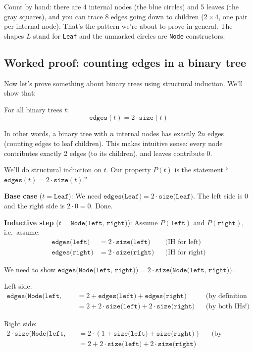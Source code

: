 \documentclass[11pt]{article}
\begin{document}
Count by hand: there are 4 internal nodes (the blue circles) and 5 leaves (the gray squares), and you can trace 8 edges going down to children ($2 \times 4$, one pair per internal node). That's the pattern we're about to prove in general. The shapes $L$ stand for \texttt{Leaf} and the unmarked circles are \texttt{Node} constructors.

\subsection{Worked proof: counting edges in a binary tree}

Now let's prove something about binary trees using structural induction. We'll show that:

For all binary trees $t$:
\[
\texttt{edges}(t) = 2 \cdot \texttt{size}(t)
\]

In other words, a binary tree with $n$ internal nodes has exactly $2n$ edges (counting edges to leaf children). This makes intuitive sense: every node contributes exactly 2 edges (to its children), and leaves contribute 0.

We'll do structural induction on $t$. Our property $P(t)$ is the statement ``$\texttt{edges}(t) = 2 \cdot \texttt{size}(t)$.''

\textbf{Base case} ($t = \texttt{Leaf}$): We need $\texttt{edges(Leaf)} = 2 \cdot \texttt{size(Leaf)}$. The left side is $0$ and the right side is $2 \cdot 0 = 0$. Done.

\textbf{Inductive step} ($t = \texttt{Node(left, right)}$): Assume $P(\texttt{left})$ and $P(\texttt{right})$, i.e.\ assume:
\begin{align*}
\texttt{edges(left)} &= 2 \cdot \texttt{size(left)} && \text{(IH for left)} \\
\texttt{edges(right)} &= 2 \cdot \texttt{size(right)} && \text{(IH for right)}
\end{align*}

We need to show $\texttt{edges(Node(left, right))} = 2 \cdot \texttt{size(Node(left, right))}$.

Left side:
\begin{align*}
\texttt{edges(Node(left, right))} &= 2 + \texttt{edges(left)} + \texttt{edges(right)} && \text{(by definition of edges)} \\
&= 2 + 2 \cdot \texttt{size(left)} + 2 \cdot \texttt{size(right)} && \text{(by both IHs!)}
\end{align*}

Right side:
\begin{align*}
2 \cdot \texttt{size(Node(left, right))} &= 2 \cdot (1 + \texttt{size(left)} + \texttt{size(right)}) && \text{(by definition of size)} \\
&= 2 + 2 \cdot \texttt{size(left)} + 2 \cdot \texttt{size(right)}
\end{align*}
\end{document}
